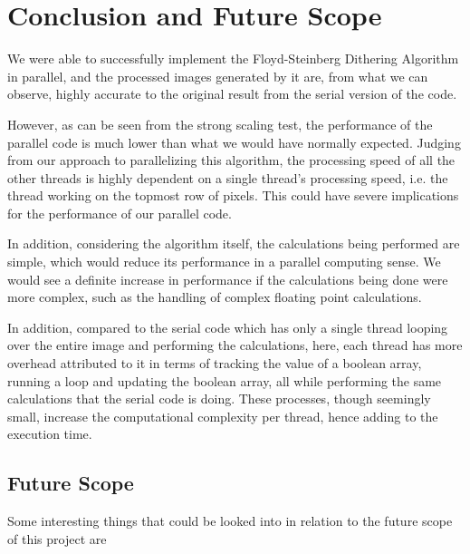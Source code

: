 \documentclass{article}
\begin{document}
\section{Conclusion and Future Scope}

We were able to successfully implement the Floyd-Steinberg Dithering Algorithm in parallel, and the processed images generated by it are, from what we can observe, highly accurate to the original result from the serial version of the code.

\medskip
\noindent However, as can be seen from the strong scaling test, the performance of the parallel code is much lower than what we would have normally expected. Judging from our approach to parallelizing this algorithm, the processing speed of all the other threads is highly dependent on a single thread's processing speed, i.e. the thread working on the topmost row of pixels. This could have severe implications for the performance of our parallel code.

\medskip
\noindent  In addition, considering the algorithm itself, the calculations being performed are simple, which would reduce its performance in a parallel computing sense. We would see a definite increase in performance if the calculations being done were more complex, such as the handling of complex floating point calculations.

\medskip
\noindent In addition, compared to the serial code which has only a single thread looping over the entire image and performing the calculations, here, each thread has more overhead attributed to it in terms of tracking the value of a boolean array, running a loop and updating the boolean array, all while performing the same calculations that the serial code is doing. These processes, though seemingly small, increase the computational complexity per thread, hence adding to the execution time.

\subsection{Future Scope}

Some interesting things that could be looked into in relation to the future scope of this project are
\end{document}
